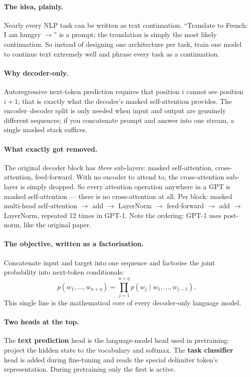 \documentclass[11pt,a4paper]{article}
\begin{document}
\paragraph{The idea, plainly.} Nearly every NLP task can be written as text continuation.
``Translate to French: I am hungry $\rightarrow$'' is a prompt; the translation is simply the
most likely continuation. So instead of designing one architecture per task, train one model
to continue text extremely well and phrase every task as a continuation.

\paragraph{Why decoder-only.} Autoregressive next-token prediction requires that position $i$
cannot see position $i+1$; that is exactly what the decoder's masked self-attention provides.
The encoder--decoder split is only needed when input and output are genuinely different
sequences; if you concatenate prompt and answer into one stream, a single masked stack
suffices.

\paragraph{What exactly got removed.} The original decoder block has \emph{three} sub-layers:
masked self-attention, cross-attention, feed-forward. With no encoder to attend to, the
cross-attention sub-layer is simply dropped. So every attention operation anywhere in a GPT is
masked self-attention --- there is no cross-attention at all. Per block: masked multi-head
self-attention $\rightarrow$ add $\rightarrow$ LayerNorm $\rightarrow$ feed-forward
$\rightarrow$ add $\rightarrow$ LayerNorm, repeated 12 times in GPT-1. Note the ordering: GPT-1
uses post-norm, like the original paper.

\paragraph{The objective, written as a factorisation.} Concatenate input and target into one
sequence and factorise the joint probability into next-token conditionals:
\[
p(w_1, \ldots, w_{n+\eta}) = \prod_{j=1}^{n+\eta} p\!\left(w_j \mid w_1, \ldots, w_{j-1}\right).
\]
This single line is the mathematical core of every decoder-only language model.

\paragraph{Two heads at the top.} The \textbf{text prediction} head is the language-model head
used in pretraining: project the hidden state to the vocabulary and softmax. The \textbf{task
classifier} head is added during fine-tuning and reads the special delimiter token's
representation. During pretraining only the first is active.
\end{document}
